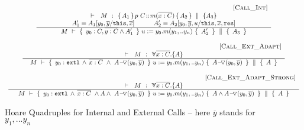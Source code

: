 \begin{figure}[htb]
{\small{
$\begin{array}{c}
 \inferruleSD{\hspace{4.7cm} [\sc{Call\_Int}]}
	{
	   	\begin{array}{c}
		\promises  M {\mprepostN{A_1}{p\ C}{m}{x}{C}{A_2} {A_3}}  \\
		{A_1' = A_1[y_0,\overline y/\prg{this}, \overline x]  \ \ \ \ \ \ \ \ \  A_2' = A_2[y_0,\overline y,u/\prg{this}, \overline x,\prg{res}]}  
		          	\end{array}
		}
	{  \hprovesN {M} 
						{ \  y_0:C,\overline {y:C} \wedge  {A_1'}\ }  
						 { \ u:=y_0.m(y_1,.. y_n)\    }
					         { \ {A_2'} \ } 
						{  \ A_3 \ }  
}
%
\\
 \\ 
 \inferruleSD{\hspace{4.7cm} [\sc{Call\_Ext}\_Adapt]}
 	{ 
	 \promises M   {\TwoStatesN {\overline {x:C}} {A}} 
        }
	{   \hprovesN{M} 
						{ \    { \external{y_0}} \,     \wedge \,  \overline{x:C}\  \wedge\ {\PushASLong {{(y_0,\overline {y})}}  {A}}  \ } 
						{ \ u:=y_0.m(y_1,.. y_n)\    }
						{ \   {\PushASLong {{(y_0,\overline {y})}}  A}  \ }
						{\  A \   }
	}	
\\
 \\ 
{
 \inferruleSD{\hspace{4.7cm} [\sc{Call\_Ext}\_Adapt\_Strong]}
 	{ 
	 \promises M   {\TwoStatesN {\overline {x:C}} {A}} 
        }
	{   \hprovesN{M} 
						{ \    { \external{y_0}} \,     \wedge \,  \overline{x:C}\ \wedge  A   \wedge\ {\PushASLong {{(y_0,\overline {y})}}  {A} }\  }   
						{ \ u:=y_0.m(y_1,.. y_n)\    }
						{ \   A \wedge {\PushASLong {{(y_0,\overline {y})}}  {A} } \  }  
						{\  A \   }	
}
}

\end{array}
$
}}
\caption{Hoare Quadruples for Internal and External Calls -- here $\overline y$ stands for $y_1, ... y_n$}
\label{f:internal:calls}
\label{f:external:calls}
\label{f:calls}
\end{figure}

